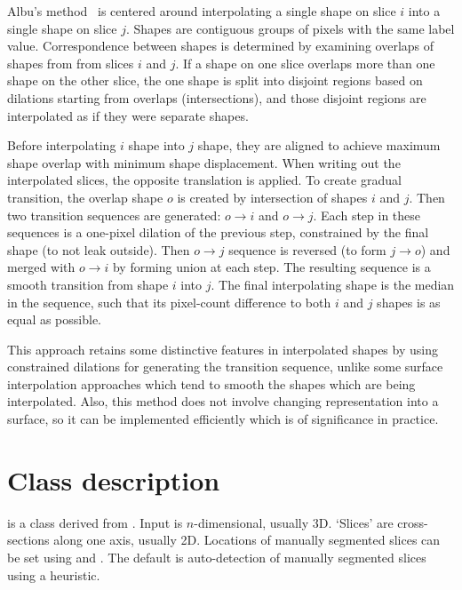 \documentclass{InsightArticle}
\begin{document}
Albu's method~\cite{Albu2008} is centered around interpolating a single shape on
slice $i$ into a single shape on slice $j$.
Shapes are contiguous groups of pixels with the same label value.
Correspondence between shapes is determined by examining overlaps
of shapes from from slices $i$ and $j$.
If a shape on one slice overlaps more than one shape on the other slice,
the one shape is split into disjoint regions based on dilations
starting from overlaps (intersections),
and those disjoint regions are interpolated as if they were separate shapes.

Before interpolating $i$ shape into $j$ shape, they are aligned
to achieve maximum shape overlap with minimum shape displacement.
When writing out the interpolated slices, the opposite translation is applied.
To create gradual transition, the overlap shape $o$ is created
by intersection of shapes $i$ and $j$.
Then two transition sequences are generated: $o\rightarrow i$ and $o\rightarrow j$.
Each step in these sequences is a one-pixel dilation of the previous step,
constrained by the final shape (to not leak outside).
Then $o\rightarrow j$ sequence is reversed (to form $j\rightarrow o$) and
merged with $o\rightarrow i$ by forming union at each step.
The resulting sequence is a smooth transition from shape $i$ into $j$.
The final interpolating shape is the median in the sequence, such that its
pixel-count difference to both $i$ and $j$ shapes is as equal as possible.

This approach retains some distinctive features in interpolated shapes
by using constrained dilations for generating the transition sequence,
unlike some surface interpolation approaches which tend to smooth the
shapes which are being interpolated.
Also, this method does not involve changing representation into a surface,
so it can be implemented efficiently which is of significance in practice.

\section{Class description}

 is a class derived from
.
Input is $n$-dimensional, usually 3D.
`Slices' are cross-sections along one axis, usually 2D.
Locations of manually segmented slices can be set using
 and .
The default is auto-detection of manually segmented slices using a heuristic.
\end{document}
